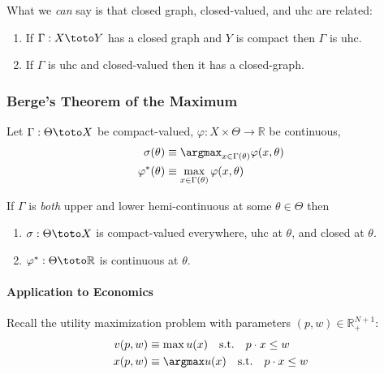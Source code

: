 \documentclass{article}
\begin{document}
What we \textit{can} say is that closed graph, closed-valued, and uhc are related:
\begin{claim}
  \begin{enumerate}
    \item If $\Gamma: X \toto Y$ has a closed graph and $Y$ is compact then $\Gamma$ is uhc.

    \item If $\Gamma$ is uhc and closed-valued then it has a closed-graph.
  \end{enumerate}
\end{claim}

\subsubsection{Berge's Theorem of the Maximum}
\label{ssub:berge_s_theorem_of_the_maximum}

\begin{theorem}\label{thm:lecture4_correspondences_maximum_theorem}
  Let $\Gamma: \Theta \toto X$ be compact-valued, $\varphi: X \times \Theta \to \mathbb{R}$ be continuous,
  \begin{align*}
    \sigma(\theta)
    &
    \equiv
    \argmax_{x \in \Gamma(\theta)}
    \varphi(x, \theta)
    \\
    \varphi^*(\theta)
    &
    \equiv
    \max_{x \in \Gamma(\theta)}
    \varphi(x, \theta)
  \end{align*}

  If $\Gamma$ is \textit{both} upper and lower hemi-continuous at some $\theta \in \Theta$ then
  \begin{enumerate}
    \item $\sigma: \Theta \toto X$ is compact-valued everywhere, uhc at $\theta$, and closed at $\theta$.

    \item $\varphi^*: \Theta \toto \mathbb{R}$ is continuous at $\theta$.
  \end{enumerate}
\end{theorem}

\paragraph{Application to Economics}
\label{par:application_to_economics}

Recall the utility maximization problem with parameters $(p, w) \in \mathbb{R}^{N + 1}_{+}$:
\begin{align*}
  v(p, w)
  &
  \equiv
  \max u(x)
  \quad
  \text{s.t.}
  \quad
  p \cdot x \le w
  \\
  x(p, w)
  &
  \equiv
  \argmax u(x)
  \quad
  \text{s.t.}
  \quad
  p \cdot x \le w
\end{align*}
\end{document}

